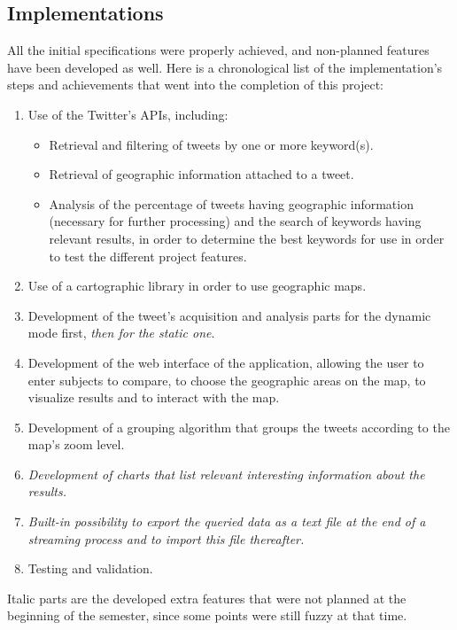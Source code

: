 \documentclass[a4paper,11pt]{report}
\begin{document}
\subsection{Implementations}
All the initial specifications were properly achieved, and non-planned features have been developed as well. Here is a chronological list of the implementation's steps and achievements that went into the completion of this project:
\begin{enumerate}
	\item Use of the Twitter's APIs, including:
	\begin{itemize}
		\item Retrieval and filtering of tweets by one or more keyword(s).
		\item Retrieval of geographic information attached to a tweet.
		\item Analysis of the percentage of tweets having geographic information (necessary for further processing) and the search of keywords having relevant results, in order to determine the best keywords for use in order to test the different project features.
	\end{itemize}
	\item Use of a cartographic library in order to use geographic maps.
	\item Development of the tweet's acquisition and analysis parts for the dynamic mode first, \textit{then for the static one}.
	\item Development of the web interface of the application, allowing the user to enter subjects to compare, to choose the geographic areas on the map, to visualize results and to interact with the map.
	\item Development of a grouping algorithm that groups the tweets according to the map's zoom level.
	\item \textit{Development of charts that list relevant interesting information about the results.}
	\item \textit{Built-in possibility to export the queried data as a text file at the end of a streaming process and to import this file thereafter.}
	\item Testing and validation.
\end{enumerate}

Italic parts are the developed extra features that were not planned at the beginning of the semester, since some points were still fuzzy at that time.
\newpage
\end{document}
